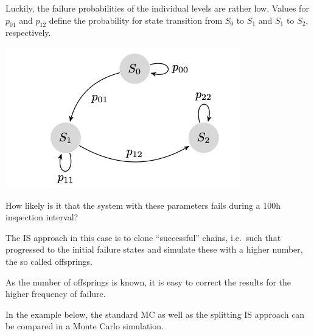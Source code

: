 \documentclass[11pt,a4paper, d]{scrartcl}
\begin{document}
Luckily, the failure probabilities of the individual levels are rather
low. Values for \(p_{01}\) and \(p_{12}\) define the probability for
state transition from \(S_0\) to \(S_1\) and \(S_1\) to \(S_2\),
respectively.

\includegraphics{figures/MarkovChain.png}

How likely is it that the system with these parameters fails during a
100h inspection interval?

The IS approach in this case is to clone ``successful'' chains,
i.e.~such that progressed to the initial failure states and simulate
these with a higher number, the so called offsprings.

As the number of offsprings is known, it is easy to correct the results
for the higher frequency of failure.

In the example below, the standard MC as well as the splitting IS
approach can be compared in a Monte Carlo simulation.
\end{document}
